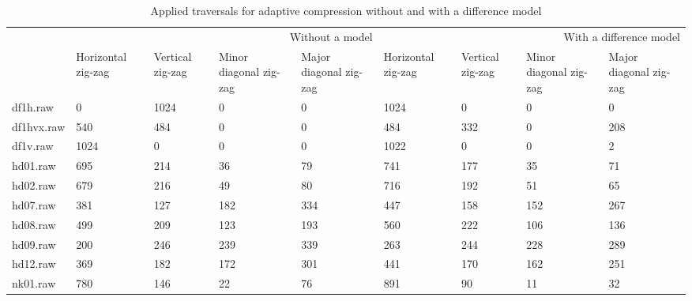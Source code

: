 \begin{table}
\caption{Applied traversals for adaptive compression without and with a difference model}
\begin{tabular}{lllllllll}
 & \multicolumn{4}{r}{Without a model} & \multicolumn{4}{r}{With a difference model} \\
 & Horizontal zig-zag & Vertical zig-zag & Minor diagonal zig-zag & Major diagonal zig-zag & Horizontal zig-zag & Vertical zig-zag & Minor diagonal zig-zag & Major diagonal zig-zag \\
df1h.raw & 0 & 1024 & 0 & 0 & 1024 & 0 & 0 & 0 \\
df1hvx.raw & 540 & 484 & 0 & 0 & 484 & 332 & 0 & 208 \\
df1v.raw & 1024 & 0 & 0 & 0 & 1022 & 0 & 0 & 2 \\
hd01.raw & 695 & 214 & 36 & 79 & 741 & 177 & 35 & 71 \\
hd02.raw & 679 & 216 & 49 & 80 & 716 & 192 & 51 & 65 \\
hd07.raw & 381 & 127 & 182 & 334 & 447 & 158 & 152 & 267 \\
hd08.raw & 499 & 209 & 123 & 193 & 560 & 222 & 106 & 136 \\
hd09.raw & 200 & 246 & 239 & 339 & 263 & 244 & 228 & 289 \\
hd12.raw & 369 & 182 & 172 & 301 & 441 & 170 & 162 & 251 \\
nk01.raw & 780 & 146 & 22 & 76 & 891 & 90 & 11 & 32 \\
\end{tabular}
\end{table}
